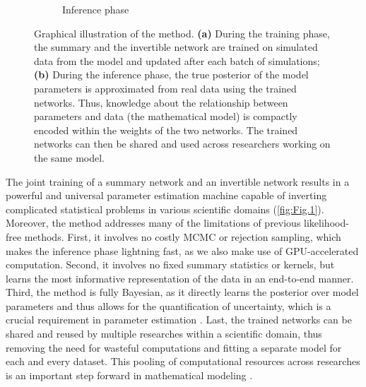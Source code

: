 \documentclass[9pt,twoside,lineno]{pnas-new}
\begin{document}
\begin{figure}
\begin{subfigure}[b]{0.49\textwidth}
    \caption{Inference phase}
    \label{fig:Fig.1b}
  \end{subfigure}
      \caption{Graphical illustration of the method. \textbf{(a)} During the training phase, the summary and the invertible network are trained on simulated data from the model and updated after each batch of simulations; \textbf{(b)} During the inference phase, the true posterior of the model parameters is approximated from real data using the trained networks. Thus, knowledge about the relationship between parameters and data (the mathematical model) is compactly encoded within the weights of the two networks. The trained networks can then be shared and used across researchers working on the same model.} \label{fig:Fig.1}
\end{figure}

The joint training of a summary network and an invertible network results in a powerful and universal parameter estimation machine capable of inverting complicated statistical problems in various scientific domains (\autoref{fig:Fig.1}). Moreover, the method addresses many of the limitations of previous likelihood-free methods. First, it involves no costly MCMC or rejection sampling, which makes the inference phase lightning fast, as we also make use of GPU-accelerated computation. Second, it involves no fixed summary statistics or kernels, but learns the most informative representation of the data in an end-to-end manner. Third, the method is fully Bayesian, as it directly learns the posterior over model parameters and thus allows for the quantification of uncertainty, which is a crucial requirement in parameter estimation \cite{kendall2017uncertainties, gelman2013bayesian}. Last, the trained networks can be shared and reused by multiple researches within a scientific domain, thus removing the need for wasteful computations and fitting a separate model for each and every dataset. This pooling of computational resources across researches is an important step forward in mathematical modeling \cite{mestdagh2018prepaid}.
\end{document}
